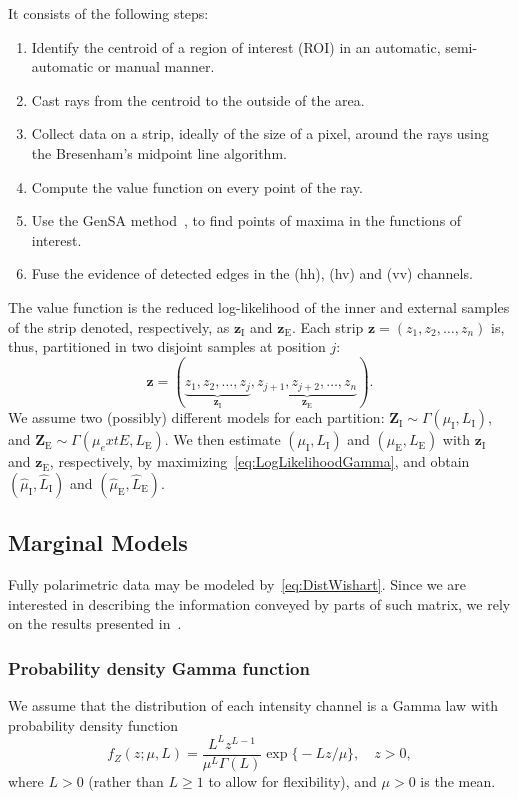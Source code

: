 \documentclass[journal]{IEEEtran}
\begin{document}
It consists of the following steps:
\begin{enumerate}
	\item Identify the centroid of a region of interest (ROI) in an automatic, semi-automatic or manual manner.
	\item Cast rays from the centroid to the outside of the area.
	\item Collect data on a strip, ideally of the size of a pixel, around the rays using the  Bresenham's midpoint line algorithm.
	\item Compute the value function on every point of the ray.
	\item Use the GenSA method~\cite{xgsh}, to find points of maxima in the functions of interest.
	\item Fuse the evidence of detected edges in the (hh), (hv) and (vv) channels.
\end{enumerate}

The value function is the reduced log-likelihood of the inner and external samples of the strip denoted, respectively, as $\bm z_\text{I}$ and $\bm z_\text{E}$.
Each strip $\bm z = (z_1,z_2,\dots,z_n)$ is, thus, partitioned in two disjoint samples at position $j$:
$$
\bm z = (\underbrace{z_1,z_2,\dots,z_j}_{\bm z_\text{I}}, 
\underbrace{z_{j+1}, z_{j+2},\dots,z_n}_{\bm z_\text{E}}).
$$
We assume two (possibly) different models for each partition:
$\bm Z_\text{I} \sim \Gamma(\mu_\text{I},L_\text{I})$, and 
$\bm Z_\text{E} \sim \Gamma(\mu_ext{E},L_\text{E})$.
We then estimate $(\mu_\text{I},L_\text{I})$ and $(\mu_\text{E},L_\text{E})$ with $\bm z_\text{I}$ and $\bm z_\text{E}$, respectively, by maximizing~\eqref{eq:LogLikelihoodGamma}, and obtain $(\widehat{\mu}_\text{I}, \widehat{L}_\text{I})$ and $(\widehat{\mu}_\text{E}, \widehat{L}_\text{E})$.

\subsection{Marginal Models}
Fully polarimetric data may be modeled by~\eqref{eq:DistWishart}.
Since we are interested in describing the information conveyed by parts of such matrix, we rely on the results presented in~\cite{lee,hsbmp}.

\subsubsection{Probability density Gamma function}
We assume that the distribution of each intensity channel is a 
Gamma law with probability density function
\begin{equation}
f_Z(z;\mu,L)=\frac{L^{L}z^{L-1}}{\mu^{L}\Gamma(L)} \exp\big\{-Lz/\mu\big\},\quad z>0,
\label{func_dens_uni_gamma}
\end{equation}
where $L>0$ (rather than $L\geq1$ to allow for flexibility), and
$\mu>0$ is the mean.
\end{document}
